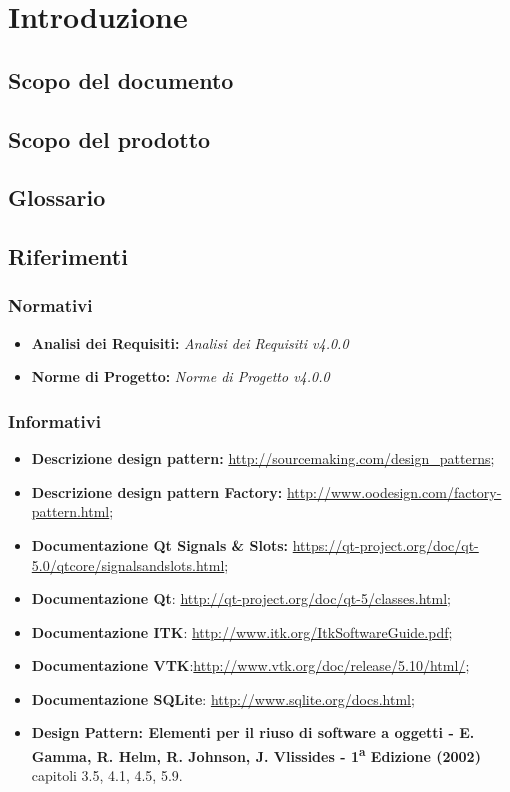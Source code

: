 \section{Introduzione}
\label{introduzione}
\subsection{Scopo del documento}
\label{scopo_documento}
\scopoDocumentoSpecifica{}
\subsection{Scopo del prodotto}
\label{scopo_prodotto}
\scopoProd{}
\subsection{Glossario}
\label{glossario}
\glossIntro{}
\subsection{Riferimenti}
\label{riferimenti}
\subsubsection{Normativi}
\label{normativi}
\begin{itemize}
\item \textbf{Analisi dei Requisiti:} \textit{Analisi dei Requisiti v4.0.0}
\item \textbf{Norme di Progetto:} \textit{Norme di Progetto v4.0.0}
\end{itemize}
\subsubsection{Informativi}
\label{informativi}
	\begin{itemize}
		\item \textbf{Descrizione design pattern:} \url{http://sourcemaking.com/design\_patterns};
		\item \textbf{Descrizione design pattern Factory:} \url{http://www.oodesign.com/factory-pattern.html};
		\item \textbf{Documentazione Qt Signals \& Slots:} \url{https://qt-project.org/doc/qt-5.0/qtcore/signalsandslots.html};
		\item \textbf{Documentazione Qt}\g{}: \url{http://qt-project.org/doc/qt-5/classes.html};
		\item \textbf{Documentazione ITK}\g{}: \url{http://www.itk.org/ItkSoftwareGuide.pdf};
		\item \textbf{Documentazione VTK}\g{}:\url{http://www.vtk.org/doc/release/5.10/html/};
		\item \textbf{Documentazione SQLite}: \url{http://www.sqlite.org/docs.html};
		\item \textbf{Design Pattern: Elementi per il riuso di software a oggetti - E. Gamma,
		R. Helm, R. Johnson, J. Vlissides - 1\textsuperscript{a} Edizione (2002) }capitoli 3.5, 4.1, 4.5, 5.9.
	\end{itemize}
